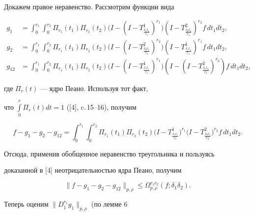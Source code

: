  


Докажем правое неравенство. Рассмотрим функции вида 


\begin{align*} 


g_1&=\int^{r_1}_0\int^{r_2}_0\Pi_{r_1}(t_1)\Pi_{r_2}(t_2) 


\big(I-(I-T^1_{\frac{\delta_1t_1}{r_1}})^{r_1}\big) 


(I-T^2_{\frac{\delta_2t_2}{r_2}})^{r_2}f\,dt_1dt_2,\\ 


% 


g_2&=\int^{r_1}_0\int^{r_2}_0\Pi_{r_1}(t_1)\Pi_{r_2}(t_2) 


\big(I-(I-T^2_{\frac{\delta_2t_2}{r_2}})^{r_2}\big) 


(I-T^1_{\frac{\delta_1t_1}{r_1}})^{r_1}f\,dt_1dt_2,\\ 


% 


g_{12}&=\int^{r_1}_0\int^{r_2}_0\Pi_{r_1}(t_1)\Pi_{r_2}(t_2) 


\big(I-(I-T^1_{\frac{\delta_1t_1}{r_1}})^{r_1}\big) 


(I-(I-T^2_{\frac{\delta_2t_2}{r_2}})^{r_2})f\,dt_1dt_2,


\end{align*} 


где $\Pi_r(t)$ --- ядро Пеано. Используя тот факт, 


что $\int\limits^r_0\Pi_r(t)dt=1$ ([4], c.\,15--16), получим 


$$ 


f-g_1-g_2-g_{12}=\int^{r_1}_0\int^{r_2}_0\Pi_{r_1}(t_1) 


\Pi_{r_2}(t_2)\big(I-T^1_{\frac{\delta_1t_1}{r_1}}\big)^{r_1} 


\big(I-T^2_{\frac{\delta_2t_2}{r_2}}\big)^{r_2}f\,dt_1dt_2. 


$$ 


Отсюда, применив обобщенное неравенство треугольника и пользуясь 


доказанной в [4] неотрицательностью ядра Пеано, получим 


$$ 


\|f-g_1-g_2-g_{12}\|_{p,\rho}\le 


\Omega^{r_1r_2}_{p,\rho}(f;\delta_1\delta_2). 


$$ 


 


Теперь оценим $\|D^{r_1}_1g_1\|_{p,\rho}$ (по лемме 6\; 


